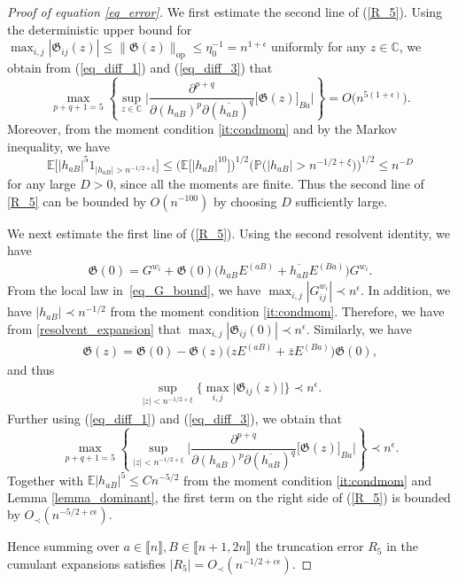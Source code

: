 \documentclass[10pt,reqno]{amsart}
\numberwithin{equation}{section}
\numberwithin{figure}{section}
\theoremstyle{plain}
\newcommand{\C}{{\mathbb{C}}}
\newcommand{\<}{\langle}
\renewcommand{\>}{\rangle}
\newcommand{\E}{\mathbb{E}}
\renewcommand{\P}{{\mathbb P}}
\begin{document}
\begin{proof}[Proof of equation \eqref{eq_error}]
We first estimate the second line of (\ref{R_5}). Using the deterministic upper bound for $\max_{i,j} |\mathfrak{G}_{ij}(z)| \leq \|\mathfrak{G}(z)\|_{\mathrm{op}} \leq \eta^{-1}_0=n^{1+\epsilon}$ uniformly for any $z\in \C$, we obtain from (\ref{eq_diff_1}) and (\ref{eq_diff_3}) that
$$\max_{p+q+1=5} \left\{ \sup_{z \in \C} \Big| \frac{\partial^{p+q} }{\partial (h_{aB})^p \partial (\overline{h_{aB}})^{q}} \big[\mathfrak{G}(z)\big]_{Ba} \Big| \right\} =O\big(n^{5(1+\epsilon)}\big).$$
Moreover, from the moment condition \ref{it:condmom} and by the Markov inequality, we have
$$\E \Big[ |h_{aB}|^{5} 1_{|h_{aB}|> n^{-1/2+\xi}}\Big] \leq \Big( \E \Big[ |h_{aB}|^{10}\Big] \Big)^{1/2} \Big( \P\big( |h_{aB}|> n^{-1/2+\xi} \big) \Big)^{1/2}  \leq n^{-D}$$
for any large $D>0$, since all the moments are finite. Thus the second line of \eqref{R_5} can be bounded by $O(n^{-100})$ by choosing $D$ sufficiently large. 


We next estimate  the first line of (\ref{R_5}). Using the second resolvent identity, we have
	\begin{align}\label{resolvent_expansion}
		\mathfrak{G}(0)=G^{w_i}+ \mathfrak{G}(0) \Big( h_{aB}E^{(aB)}+\overline{h_{aB}} E^{(Ba)} \Big) G^{w_i}.
	\end{align}
	From the local law in~\eqref{eq_G_bound}, we have $ \max_{i,j}|G^{w_i}_{ij}| \prec n^{\epsilon}$. In addition, we have $|h_{aB}| \prec n^{-1/2}$ from the moment condition \ref{it:condmom}. Therefore, we have from \eqref{resolvent_expansion} that $\max_{i,j}|\mathfrak{G}_{ij}(0)| \prec n^{\epsilon}$. Similarly, we have
	\begin{align}\label{resolvent_expansion2}
		\mathfrak{G}(z)=\mathfrak{G}(0)- \mathfrak{G}(z) \Big( z E^{(aB)}+\overline{z} E^{(Ba)} \Big) \mathfrak{G}(0),
	\end{align}
	and thus
	\begin{align}
		\sup_{|z|<n^{-1/2+\xi}}\Big\{ \max_{i,j} \Big|\mathfrak{G}_{ij}(z)\Big|\Big\} \prec n^{\epsilon}.
	\end{align}
	Further using (\ref{eq_diff_1}) and (\ref{eq_diff_3}), we obtain that
	$$\max_{p+q+1=5} \left\{ \sup_{|z| < n^{-1/2+\xi}} \Big| \frac{\partial^{p+q} }{\partial (h_{aB})^p \partial (\overline{h_{aB}})^{q}} \big[\mathfrak{G}(z)\big]_{Ba} \Big| \right\}  \prec n^{\epsilon}.$$
	Together with $\E|h_{aB}|^5\le Cn^{-5/2}$ from the moment condition \ref{it:condmom} and Lemma \ref{lemma_dominant}, the first term on the right side of (\ref{R_5}) is bounded by $O_{\prec}(n^{-5/2+c\epsilon})$. 
	
	Hence summing over $a \in \llbracket n \rrbracket,B\in \llbracket n+1,2n \rrbracket$ the truncation error $R_5$ in the cumulant expansions satisfies $|R_5|=O_{\prec}(n^{-1/2+c\epsilon})$.

\end{proof}
\end{document}
